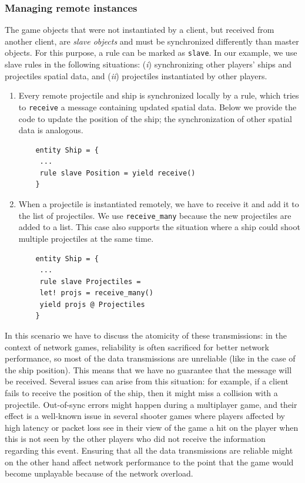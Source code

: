 \subsubsection{Managing remote instances}
The game objects that were not instantiated by a client, but received from another client, are \textit{slave objects} and must be synchronized differently than master objects. For this purpose, a rule can be marked as \texttt{slave}. In our example, we use slave rules in the following situations: (\textit{i}) synchronizing other players' ships and projectiles spatial data, and (\textit{ii}) projectiles instantiated by other players.

\begin{enumerate}
	\item Every remote projectile and ship is synchronized locally by a rule, which tries to \texttt{receive} a message containing updated spatial data. Below we provide the code to update the position of the ship; the synchronization of other spatial data is analogous.
	
	\begin{lstlisting}
	entity Ship = {
	 ...
	 rule slave Position = yield receive()
	}
	\end{lstlisting}
	
	\item When a projectile is instantiated remotely, we have to receive it and add it to the list of projectiles. We use \texttt{receive\_many} because the new projectiles are added to a list. This case also supports the situation where a ship could shoot multiple projectiles at the same time.
	
	\begin{lstlisting}
	entity Ship = {
	 ...
	 rule slave Projectiles =
	 let! projs = receive_many()
	 yield projs @ Projectiles
	}
	\end{lstlisting}
\end{enumerate}

In this scenario we have to discuss the atomicity of these transmissions: in the context of network games, reliability is often sacrificed for better network performance, so most of the data transmissions are unreliable (like in the case of the ship position). This means that we have no guarantee that the message will be received. Several issues can arise from this situation: for example, if a client fails to receive the position of the ship, then it might miss a collision with a projectile. Out-of-sync errors might happen during a multiplayer game, and their effect is a well-known issue in several shooter games where players affected by high latency or packet loss see in their view of the game a hit on the player when this is not seen by the other players who did not receive the information regarding this event. Ensuring that all the data transmissions are reliable might on the other hand affect network performance to the point that the game would become unplayable because of the network overload. 

